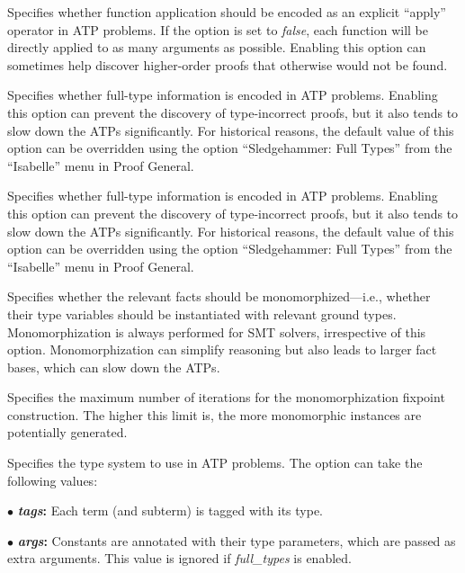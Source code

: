 \documentclass[a4paper,12pt]{article}
\begin{document}
\begin{enum}
Specifies whether function application should be encoded as an explicit
``apply'' operator in ATP problems. If the option is set to \textit{false}, each
function will be directly applied to as many arguments as possible. Enabling
this option can sometimes help discover higher-order proofs that otherwise would
not be found.

Specifies whether full-type information is encoded in ATP problems. Enabling
this option can prevent the discovery of type-incorrect proofs, but it also
tends to slow down the ATPs significantly. For historical reasons, the default
value of this option can be overridden using the option ``Sledgehammer: Full
Types'' from the ``Isabelle'' menu in Proof General.

Specifies whether full-type information is encoded in ATP problems. Enabling
this option can prevent the discovery of type-incorrect proofs, but it also
tends to slow down the ATPs significantly. For historical reasons, the default
value of this option can be overridden using the option ``Sledgehammer: Full
Types'' from the ``Isabelle'' menu in Proof General.

Specifies whether the relevant facts should be monomorphized---i.e., whether
their type variables should be instantiated with relevant ground types.
Monomorphization is always performed for SMT solvers, irrespective of this
option. Monomorphization can simplify reasoning but also leads to larger fact
bases, which can slow down the ATPs.

Specifies the maximum number of iterations for the monomorphization fixpoint
construction. The higher this limit is, the more monomorphic instances are
potentially generated.

Specifies the type system to use in ATP problems. The option can take the
following values:

\begin{enum}
\item[$\bullet$] \textbf{\textit{tags}:} Each term (and subterm) is tagged with
its type.

\item[$\bullet$] \textbf{\textit{args}:} Constants are annotated with
their type parameters, which are passed as extra arguments. This value is
ignored if \textit{full\_types} is enabled.


\end{enum}
\end{enum}
\end{document}
